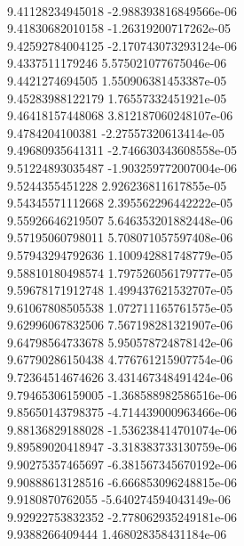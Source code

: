 { \\
9.41128234945018 -2.988393816849566e-06
 \\
9.41830682010158 -1.26319200717262e-05
 \\
9.42592784004125 -2.170743073293124e-06
 \\
9.4337511179246 5.575021077675046e-06
 \\
9.4421274694505 1.550906381453387e-05
 \\
9.45283988122179 1.76557332451921e-05
 \\
9.46418157448068 3.812187060248107e-06
 \\
9.4784204100381 -2.27557320613414e-05
 \\
9.49680935641311 -2.746630343608558e-05
 \\
9.51224893035487 -1.903259772007004e-06
 \\
9.5244355451228 2.926236811617855e-05
 \\
9.54345571112668 2.395562296442222e-05
 \\
9.55926646219507 5.646353201882448e-06
 \\
9.57195060798011 5.708071057597408e-06
 \\
9.57943294792636 1.100942881748779e-05
 \\
9.58810180498574 1.797526056179777e-05
 \\
9.59678171912748 1.499437621532707e-05
 \\
9.61067808505538 1.072711165761575e-05
 \\
9.62996067832506 7.567198281321907e-06
 \\
9.64798564733678 5.950578724878142e-06
 \\
9.67790286150438 4.776761215907754e-06
 \\
9.72364514674626 3.431467348491424e-06
 \\
9.79465306159005 -1.368588982586516e-06
 \\
9.85650143798375 -4.714439000963466e-06
 \\
9.88136829188028 -1.536238414701074e-06
 \\
9.89589020418947 -3.318383733130759e-06
 \\
9.90275357465697 -6.381567345670192e-06
 \\
9.90888613128516 -6.666853096248815e-06
 \\
9.9180870762055 -5.640274594043149e-06
 \\
9.92922753832352 -2.778062935249181e-06
 \\
9.9388266409444 1.468028358431184e-06
 \\
}
